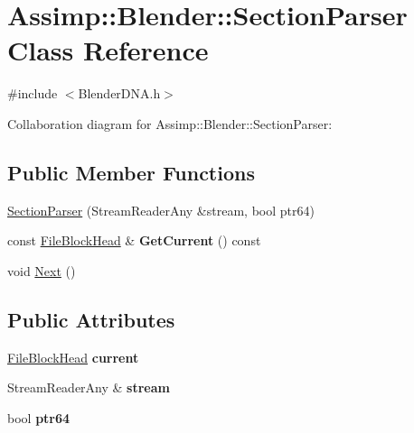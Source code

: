 \hypertarget{class_assimp_1_1_blender_1_1_section_parser}{\section{Assimp\+:\+:Blender\+:\+:Section\+Parser Class Reference}
\label{class_assimp_1_1_blender_1_1_section_parser}
}


{\ttfamily \#include $<$Blender\+D\+N\+A.\+h$>$}



Collaboration diagram for Assimp\+:\+:Blender\+:\+:Section\+Parser\+:
\subsection*{Public Member Functions}
\begin{DoxyCompactItemize}
\item 
\hyperlink{class_assimp_1_1_blender_1_1_section_parser_a122328903815c862403d2f9434f7d817}{Section\+Parser} (Stream\+Reader\+Any \&stream, bool ptr64)
\item 
\hypertarget{class_assimp_1_1_blender_1_1_section_parser_ac17e0de596767f6d86db696359bfc201}{const \hyperlink{struct_assimp_1_1_blender_1_1_file_block_head}{File\+Block\+Head} \& {\bfseries Get\+Current} () const }\label{class_assimp_1_1_blender_1_1_section_parser_ac17e0de596767f6d86db696359bfc201}

\item 
void \hyperlink{class_assimp_1_1_blender_1_1_section_parser_aea8492b62c76236a9cebf42c3c0b66d3}{Next} ()
\end{DoxyCompactItemize}
\subsection*{Public Attributes}
\begin{DoxyCompactItemize}
\item 
\hypertarget{class_assimp_1_1_blender_1_1_section_parser_a0e1d0a41f22020b27f33e510d44667f4}{\hyperlink{struct_assimp_1_1_blender_1_1_file_block_head}{File\+Block\+Head} {\bfseries current}}\label{class_assimp_1_1_blender_1_1_section_parser_a0e1d0a41f22020b27f33e510d44667f4}

\item 
\hypertarget{class_assimp_1_1_blender_1_1_section_parser_a73fb55e7cc5aeeef0b1c334e497fdd84}{Stream\+Reader\+Any \& {\bfseries stream}}\label{class_assimp_1_1_blender_1_1_section_parser_a73fb55e7cc5aeeef0b1c334e497fdd84}

\item 
\hypertarget{class_assimp_1_1_blender_1_1_section_parser_ab1270d8e71390cc9a94cb1877248c56c}{bool {\bfseries ptr64}}\label{class_assimp_1_1_blender_1_1_section_parser_ab1270d8e71390cc9a94cb1877248c56c}

\end{DoxyCompactItemize}


